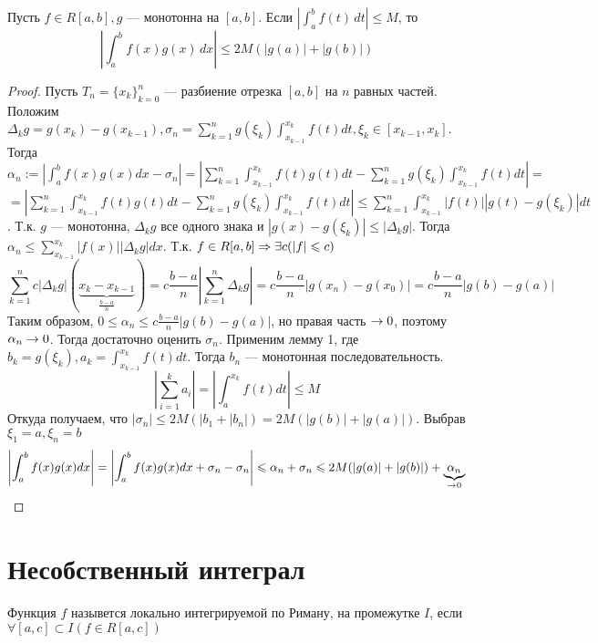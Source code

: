 \begin{lemma}[Абель]
    Пусть $f \in R[a, b], g$ --- монотонна на $[a, b]$. Если  $\left\lvert \int_{a}^{b} f(t) \,dt\right\rvert \le M$, то 
    $$\left\lvert \int_{a}^{b} f(x)g(x) \,dx\right\rvert  \le 2M(|g(a)| + |g(b)|)$$
\end{lemma}
\begin{proof}
    Пусть $T_n = \{x_k\}_{k = 0}^n$ --- разбиение отрезка $[a, b]$ на $n$ равных частей. Положим $\Delta_kg = g(x_k) - g(x_{k-1}), \sigma_n = \sum_{k = 1}^{n} g(\xi_k)\int_{x_{k-1}}^{x_k}f(t)dt, \xi_k \in [x_{k-1}, x_k]$. 
    Тогда $\alpha_n := \left\lvert \int_{a}^{b}f(x)g(x)dx - \sigma_n\right\rvert = \left\lvert \sum_{k = 1}^{n}\int_{x_{k-1}}^{x_k}f(t)g(t)dt - \sum_{k = 1}^{n} g(\xi_k)\int_{x_{k-1}}^{x_k}f(t)dt\right\rvert = $ \newline $ = \left\lvert \sum_{k = 1}^{n}\int_{x_{k-1}}^{x_k}f(t)g(t)dt - \sum_{k = 1}^{n} g(\xi_k)\int_{x_{k-1}}^{x_k}f(t)dt\right\rvert \le \sum_{k = 1}^{n}\int_{x_{k-1}}^{x_k}|f(t)||g(t) - g(\xi_k)|dt$. Т.к. $g$ --- монотонна, $\Delta_kg$ все одного знака и $|g(x) - g(\xi_k)| \le |\Delta_kg|$. Тогда $\alpha_n \le \sum_{x_{k - 1}}^{x_k}|f(x)||\Delta_kg|dx$. Т.к. $f \in R[a, b] \Rightarrow \exists c (|f| \leqslant c)$
    $$\sum_{k = 1}^nc|\Delta_kg|(\underbrace{x_k - x_{k-1}}_{\frac{b - a}{n}}) = c\frac{b - a}{n}\left\lvert \sum_{k  =1}^{n} \Delta_kg\right\rvert = c\frac{b - a}{n}|g(x_n) - g(x_0)| = c\frac{b - a}{n}|g(b) - g(a)|$$
    Таким образом, $0 \le \alpha_n \le c\frac{b - a}{n}|g(b) - g(a)|$, но правая часть $\rightarrow 0$, поэтому $\alpha_n \rightarrow 0$. Тогда достаточно оценить $\sigma_n$. Применим лемму 1, где $b_k = g(\xi_k), a_k = \int_{x_{k-1}}^{x_k}f(t)dt$. Тогда $b_n$ --- монотонная последовательность.
    $$\left\lvert \sum_{i = 1}^{k} a_i\right\rvert = \left\lvert \int_{a}^{x_k}f(t)dt\right\rvert 
    \le M$$
    Откуда получаем, что $|\sigma_n| \le 2M(|b_1 + |b_n|) = 2M(|g(b)| + |g(a)|)$. Выбрав $\xi_1 = a, \xi_n = b$
    $$\left\lvert \int_{a}^{b}f(x)g(x)dx \right\rvert = \left\lvert \int_{a}^{b}f(x)g(x)dx + \sigma_n - \sigma_n\right\rvert \leqslant \alpha_n + \sigma_n \leqslant 2M(|g(a)| + |g(b)|) + \underbrace{\alpha_n}_{\rightarrow 0}$$
\end{proof}

\section{Несобственный интеграл}
\begin{definition}
    Функция $f$ назывется локально интегрируемой по Риману, на промежутке $I$, если $\forall [a, c] \subset I (f \in R[a, c])$
\end{definition}


